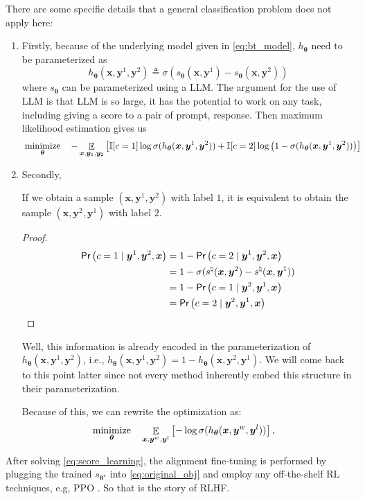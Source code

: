 \documentclass[11pt,a4paper]{article}
\begin{document}
There are some specific details that a general classification problem does not apply here:
\begin{enumerate}
\item Firstly, because of the underlying model given in \eqref{eq:bt_model}, $h_{\boldsymbol \theta}$ need to be parameterized as 
\[
h_{\boldsymbol \theta}(\bm{x}, \bm{y}^{1}, \bm{y}^{2}) 
\triangleq \sigma \left(  s_{\boldsymbol \theta}(\bm{x}, \bm{y}^{1}) - s_{\boldsymbol \theta}(\bm{x}, \bm{y}^{2})\right)
\]
where $s_{\boldsymbol \theta}$ can be parameterized using a LLM. The argument for the use of LLM is that LLM is so large, it has the potential to work on any task, including giving a score to a pair of prompt, response.
Then maximum likelihood estimation gives us
\begin{align}
& \operatorname*{\text{minimize}}_{\boldsymbol \theta} \quad -\mathop{\mathbb{E}}_{\bm{x}, \bm{y}_1, \bm{y}_2} \left[    \mathbb{I}[c=1] \log \sigma (h_{\boldsymbol \theta}(\bm{x}, \bm{y}^{1}, \bm{y}^{2})) + \mathbb{I}[c=2] \log \left( 1-  \sigma(h_{\boldsymbol \theta}(\bm{x}, \bm{y}^{1}, \bm{y}^{2}))\right)\right]
\end{align}


\item Secondly, 
\begin{remark}
If we obtain a sample $(\bm{x}, \bm{y}^{1}, \bm{y}^{2})$ with label $1$, it is equivalent to obtain the sample $(\bm{x}, \bm{y}^{2}, \bm{y}^{1})$ with label $2$.
\end{remark}
\begin{proof}
\begin{align*}
\textsf{Pr}\left(c=1 \mid \bm{y}^{1}, \bm{y}^{2}, \bm{x}\right) 
&= 1- \textsf{Pr}\left(c=2 \mid \bm{y}^{1}, \bm{y}^{2}, \bm{x}\right) \\
&= 1- \sigma(s^{\natural}(\bm{x}, \bm{y}^{2}) - s^{\natural}(\bm{x}, \bm{y}^{1})) \\
&= 1 - \textsf{Pr}\left(c=1 \mid \bm{y}^{2}, \bm{y}^{1}, \bm{x}\right)\\
&= \textsf{Pr}\left(c=2 \mid \bm{y}^{2}, \bm{y}^{1}, \bm{x}\right)
\end{align*} 
\end{proof}
Well, this information is already encoded in the parameterization of $h_{\boldsymbol \theta}(\bm{x}, \bm{y}^{1}, \bm{y}^{2})$, i.e., $h_{\boldsymbol \theta}(\bm{x}, \bm{y}^{1}, \bm{y}^{2}) = 1-h_{\boldsymbol \theta}(\bm{x}, \bm{y}^{2}, \bm{y}^{1})$.
We will come back to this point latter since not every method inherently embed this structure in their parameterization.

Because of this, we can rewrite the optimization as:
\begin{align}
\label{eq:score_learning}
& \operatorname*{\text{minimize}}_{\boldsymbol \theta} \quad \mathop{\mathbb{E}}_{\bm{x}, \bm{y}^{w} ,\bm{y}^{l}} \left[   - \log \sigma (h_{\boldsymbol \theta}(\bm{x}, \bm{y}^{w}, \bm{y}^{l})) \right],
\end{align}
\end{enumerate}
After solving \eqref{eq:score_learning}, the alignment fine-tuning is performed by plugging the trained $s_{\boldsymbol \theta^{\star }}$ into \eqref{eq:original_obj} and employ any off-the-shelf RL techniques, e.g, PPO \citep{schulman2017proximal}.
So that is the story of RLHF.
\end{document}
